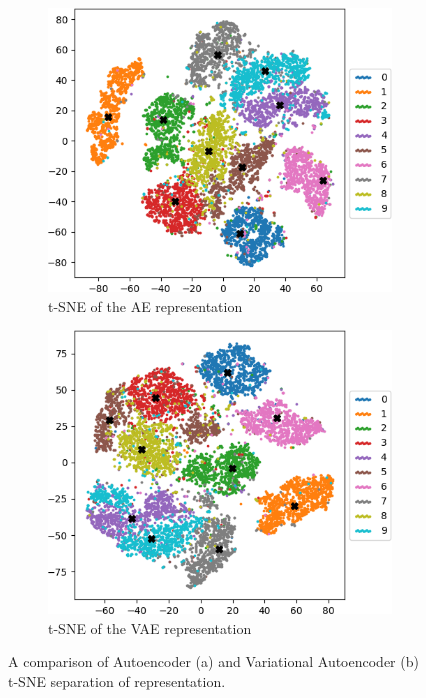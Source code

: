 \begin{figure}[]
     \centering
     \begin{subfigure}[b]{0.48\textwidth}
         \centering
         \includegraphics[width=\textwidth]{observational/img/vae/ae_tsne.png}
         \caption{t-SNE of the AE representation}
     \end{subfigure} 
     \hfill
     \begin{subfigure}[b]{0.48\textwidth}
          \includegraphics[width=\textwidth]{observational/img/vae/vae_tsne.png}
         \caption{t-SNE of the VAE representation}
     \end{subfigure} 
     \caption[Comparison of AE and VAE latent separation]{A comparison of Autoencoder (a) and Variational Autoencoder (b) t-SNE separation of representation.}
    \label{fig:vae-separability}
\end{figure}

